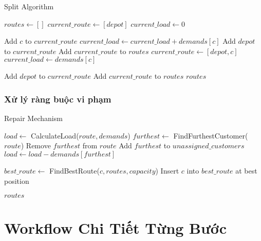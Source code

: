 \documentclass[12pt,a4paper]{article}
\begin{document}
\begin{algorithm}
\caption{Split Algorithm}
\begin{algorithmic}[1]
    \State $routes \gets []$
    \State $current\_route \gets [depot]$
    \State $current\_load \gets 0$
    
            \State Add $c$ to $current\_route$
            \State $current\_load \gets current\_load + demands[c]$
        \Else
            \State Add $depot$ to $current\_route$
            \State Add $current\_route$ to $routes$
            \State $current\_route \gets [depot, c]$
            \State $current\_load \gets demands[c]$
        \EndIf
    \EndFor
    
    \State Add $depot$ to $current\_route$
    \State Add $current\_route$ to $routes$
    \State \Return $routes$
\EndFunction
\end{algorithmic}
\end{algorithm}

\subsubsection{Xử lý ràng buộc vi phạm}

\begin{algorithm}
\caption{Repair Mechanism}
\begin{algorithmic}[1]
        \State $load \gets$ CalculateLoad($route, demands$)
            \State $furthest \gets$ FindFurthestCustomer($route$)
            \State Remove $furthest$ from $route$
            \State Add $furthest$ to $unassigned\_customers$
            \State $load \gets load - demands[furthest]$
        \EndWhile
    \EndFor
    
        \State $best\_route \gets$ FindBestRoute($c, routes, capacity$)
        \State Insert $c$ into $best\_route$ at best position
    \EndFor
    
    \State \Return $routes$
\EndFunction
\end{algorithmic}
\end{algorithm}

\newpage

\section{Workflow Chi Tiết Từng Bước}
\end{document}
